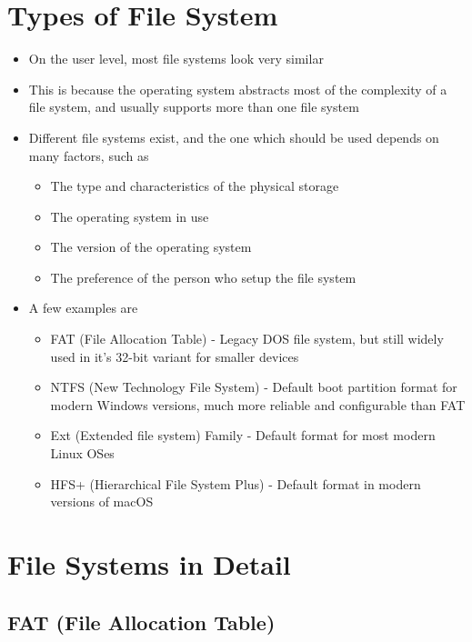 \section*{Types of File System}

\begin{itemize}
  \item On the user level, most file systems look very similar
  \item This is because the operating system abstracts most of the complexity of a file system, and usually supports more than one file system
  \item Different file systems exist, and the one which should be used depends on many factors, such as
  \begin{itemize}
    \item The type and characteristics of the physical storage
    \item The operating system in use
    \item The version of the operating system
    \item The preference of the person who setup the file system
  \end{itemize}
  \item A few examples are
  \begin{itemize}
    \item FAT (File Allocation Table) - Legacy DOS file system, but still widely used in it's 32-bit variant for smaller devices
    \item NTFS (New Technology File System) - Default boot partition format for modern Windows versions, much more reliable and configurable than FAT
    \item Ext (Extended file system) Family - Default format for most modern Linux OSes
    \item HFS+ (Hierarchical File System Plus) - Default format in modern versions of macOS
  \end{itemize}
\end{itemize}

\section*{File Systems in Detail}

\subsection*{FAT (File Allocation Table)}

